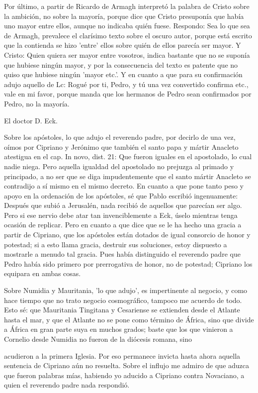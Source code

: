 Por último, a partir de Ricardo de Armagh interpretó la palabra de Cristo sobre la ambición, no sobre la mayoría, porque dice que Cristo presuponía que había uno mayor entre ellos, aunque no indicaba quién fuese. Respondo: Sea lo que sea de Armagh, prevalece el clarísimo texto sobre el oscuro autor, porque está escrito que la contienda se hizo 'entre' ellos sobre quién de ellos parecía ser mayor. Y Cristo: Quien quiera ser mayor entre vosotros, indica bastante que no se suponía que hubiese ningún mayor, y por la consecuencia del texto es patente que no quiso que hubiese ningún 'mayor etc.'. Y en cuanto a que para su confirmación adujo aquello de Lc: Rogué por ti, Pedro, y tú una vez convertido confirma etc., vale en mi favor, porque manda que los hermanos de Pedro sean confirmados por Pedro, no la mayoría.

\marginpar{\small[273]} El doctor D. Eck.

Sobre los apóstoles, lo que adujo el reverendo padre, por decirlo de una vez, oímos por Cipriano y Jerónimo que también el santo papa y mártir Anacleto atestigua en el cap. In novo, dist. 21: Que fueron iguales en el apostolado, lo cual nadie niega. Pero aquella igualdad del apostolado no prejuzga al primado y principado, a no ser que se diga impudentemente que el santo mártir Anacleto se contradijo a sí mismo en el mismo decreto. En cuanto a que pone tanto peso y apoyo en la ordenación de los apóstoles, sé que Pablo escribió ingenuamente: Después que subió a Jerusalén, nada recibió de aquellos que parecían ser algo. Pero si ese nervio debe atar tan invenciblemente a Eck, úselo mientras tenga ocasión de replicar. Pero en cuanto a que dice que se le ha hecho una gracia a partir de Cipriano, que los apóstoles están dotados de igual consorcio de honor y potestad; si a esto llama gracia, destruir sus soluciones, estoy dispuesto a mostrarle a menudo tal gracia. Pues había distinguido el reverendo padre que Pedro había sido primero por prerrogativa de honor, no de potestad; Cipriano los equipara en ambas cosas.

Sobre Numidia y Mauritania, 'lo que adujo', es impertinente al negocio, y como hace tiempo que no trato negocio cosmográfico, tampoco me acuerdo de todo. Esto sé: que Mauritania Tingitana y Cesariense se extienden desde el Atlante hasta el mar, y que el Atlante no se pone como término de África, sino que divide a África en gran parte suya en muchos grados; baste que los que vinieron a Cornelio desde Numidia no fueron de la diócesis romana, sino

acudieron a la primera Iglesia. Por eso permanece invicta hasta ahora aquella sentencia de Cipriano aún no resuelta. Sobre el influjo me admiro de que aduzca que fueron palabras mías, habiendo yo aducido a Cipriano contra Novaciano, a quien el reverendo padre nada respondió.


